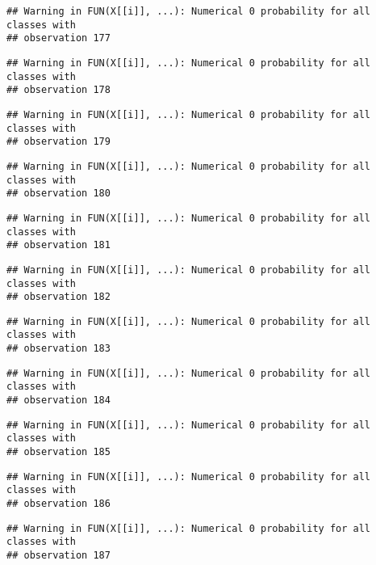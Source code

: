 \documentclass[
]{article}
\begin{document}
\begin{verbatim}
## Warning in FUN(X[[i]], ...): Numerical 0 probability for all classes with
## observation 177
\end{verbatim}

\begin{verbatim}
## Warning in FUN(X[[i]], ...): Numerical 0 probability for all classes with
## observation 178
\end{verbatim}

\begin{verbatim}
## Warning in FUN(X[[i]], ...): Numerical 0 probability for all classes with
## observation 179
\end{verbatim}

\begin{verbatim}
## Warning in FUN(X[[i]], ...): Numerical 0 probability for all classes with
## observation 180
\end{verbatim}

\begin{verbatim}
## Warning in FUN(X[[i]], ...): Numerical 0 probability for all classes with
## observation 181
\end{verbatim}

\begin{verbatim}
## Warning in FUN(X[[i]], ...): Numerical 0 probability for all classes with
## observation 182
\end{verbatim}

\begin{verbatim}
## Warning in FUN(X[[i]], ...): Numerical 0 probability for all classes with
## observation 183
\end{verbatim}

\begin{verbatim}
## Warning in FUN(X[[i]], ...): Numerical 0 probability for all classes with
## observation 184
\end{verbatim}

\begin{verbatim}
## Warning in FUN(X[[i]], ...): Numerical 0 probability for all classes with
## observation 185
\end{verbatim}

\begin{verbatim}
## Warning in FUN(X[[i]], ...): Numerical 0 probability for all classes with
## observation 186
\end{verbatim}

\begin{verbatim}
## Warning in FUN(X[[i]], ...): Numerical 0 probability for all classes with
## observation 187
\end{verbatim}
\end{document}
